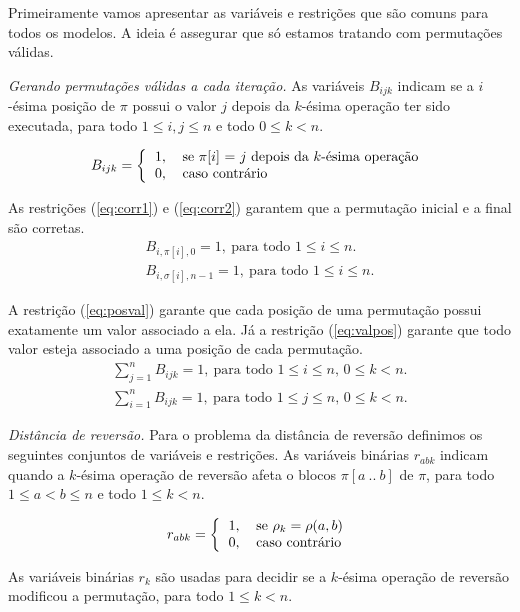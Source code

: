 Primeiramente vamos apresentar as variáveis e restrições que são
comuns para todos os modelos. A ideia é assegurar que só estamos
tratando com permutações válidas.

\textit{Gerando permutações válidas a cada iteração.} 
As variáveis $B_{ijk}$ indicam se a $i$-ésima posição de $\pi$ possui
o valor $j$ depois da $k$-ésima operação ter sido executada, para todo
$1 \le i, j \le n$ e todo $ 0 \le k < n$.

\[ 
B_{ijk} = \left \{ 
\begin{tabular}{ll} 
  1, & se $\pi[i]$ = $j$ depois da $k$-ésima operação \\ 
  0, & caso contrário
\end{tabular} 
\right .
\]

As restrições (\ref{eq:corr1}) e (\ref{eq:corr2}) garantem que a
permutação inicial e a final são corretas. 
\begin{align} 
  B_{i,\pi[i],0} = 1,~\text{para todo $1 \le i \le n$}. \label{eq:corr1} \\
  B_{i,\sigma[i],n-1} = 1,~\text{para todo $1 \le i \le n$}. \label{eq:corr2}
\end{align}

A restrição (\ref{eq:posval}) garante que cada posição de uma
permutação possui exatamente um valor associado a ela. Já a restrição
(\ref{eq:valpos}) garante que todo valor esteja associado a uma
posição de cada permutação.
\begin{align}
  \sum_{j=1}^{n} B_{ijk} = 1,~\text{para todo $1 \le i \le n$, 
  $0 \le k < n$}. \label{eq:posval} \\
  \sum_{i=1}^{n} B_{ijk} = 1,~\text{para todo $1 \le j \le n$, $0 \le
   k < n$}. \label{eq:valpos}
\end{align}

\textit{Distância de reversão.}
Para o problema da distância de reversão definimos os seguintes
conjuntos de variáveis e restrições. As variáveis binárias $r_{abk}$
indicam quando a $k$-ésima operação de reversão afeta o blocos
$\pi[a~..~b]$ de $\pi$, para todo $1 \le a < b \le n$ e todo
$1 \le k < n$.

\[
r_{abk} = \left \{ 
\begin{tabular}{ll} 
  1, & se $\rho_{k} = \rho(a,b)$ \\
  0, & caso contrário
\end{tabular} 
\right .
\]

As variáveis binárias $r_{k}$ são usadas para decidir se a $k$-ésima
operação de reversão modificou a permutação, para todo $ 1 \le k < n$.

